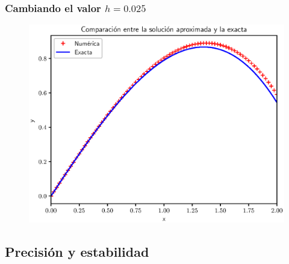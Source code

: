 \documentclass[12pt]{beamer}
\begin{document}
\begin{frame}
\frametitle{Cambiando el valor $h = 0.025$}
\begin{figure}
	\centering
	\includegraphics[scale=0.55]{Imagenes/plot_euler_ejercicio_03.eps}
\end{figure}
\end{frame}

\subsection{Precisión y estabilidad}
\end{document}
